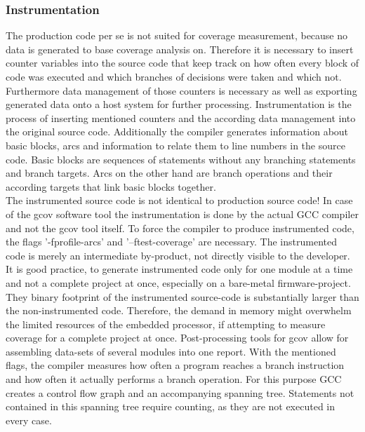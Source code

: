 \documentclass[master,english,smartquotes,apa]{hgbthesis}
\begin{document}
			\subsubsection{Instrumentation}
				The production code per se is not suited for coverage measurement, because no data is generated to base coverage analysis on. Therefore it is necessary to insert counter variables into the source code that keep track on how often every block of code was executed and which branches of decisions were taken and which not. Furthermore data management of those counters is necessary as well as exporting generated data onto a host system for further processing. Instrumentation is the process of inserting mentioned counters and the according data management into the original source code. Additionally the compiler generates information about basic blocks, arcs and information to relate them to line numbers in the source code. Basic blocks are sequences of statements without any branching statements and branch targets. Arcs on the other hand are branch operations and their according targets that link basic blocks together. \\
				
				The instrumented source code is not identical to production source code! In case of the gcov software tool the instrumentation is done by the actual GCC compiler and not the gcov tool itself. To force the compiler to produce instrumented code, the flags '-fprofile-arcs' and '–ftest-coverage' are necessary. The instrumented code is merely an intermediate by-product, not directly visible to the developer. It is good practice, to generate instrumented code only for one module at a time and not a complete project at once, especially on a bare-metal firmware-project. They binary footprint of the instrumented source-code is substantially larger than the non-instrumented code. Therefore, the demand in memory might overwhelm the limited resources of the embedded processor, if attempting to measure coverage for a complete project at once. Post-processing tools for gcov allow for assembling data-sets of several modules into one report. With the mentioned flags, the compiler measures how often a program reaches a branch instruction and how often it actually performs a branch operation. For this purpose GCC creates a control flow graph and an accompanying spanning tree. Statements not contained in this spanning tree require counting, as they are not executed in every case. \\
				
				
\end{document}
